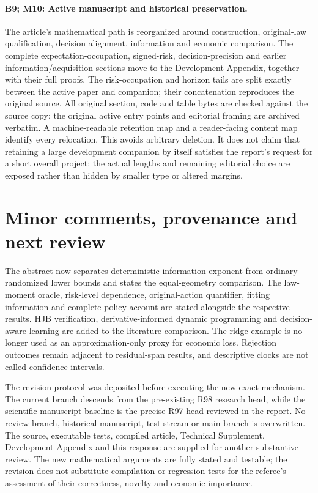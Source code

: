 \documentclass[ecta,nameyear,draft]{econsocart}
\begin{document}
\paragraph{B9; M10: Active manuscript and historical preservation.}
The article's mathematical path is reorganized around construction, original-law qualification, decision alignment, information and economic comparison. The complete expectation-occupation, signed-risk, decision-precision and earlier information/acquisition sections move to the Development Appendix, together with their full proofs. The risk-occupation and horizon tails are split exactly between the active paper and companion; their concatenation reproduces the original source. All original section, code and table bytes are checked against the source copy; the original active entry points and editorial framing are archived verbatim. A machine-readable retention map and a reader-facing content map identify every relocation. This avoids arbitrary deletion. It does not claim that retaining a large development companion by itself satisfies the report's request for a short overall project; the actual lengths and remaining editorial choice are exposed rather than hidden by smaller type or altered margins.

\section{Minor comments, provenance and next review}
The abstract now separates deterministic information exponent from ordinary randomized lower bounds and states the equal-geometry comparison. The law-moment oracle, risk-level dependence, original-action quantifier, fitting information and complete-policy account are stated alongside the respective results. HJB verification, derivative-informed dynamic programming and decision-aware learning are added to the literature comparison. The ridge example is no longer used as an approximation-only proxy for economic loss. Rejection outcomes remain adjacent to residual-span results, and descriptive clocks are not called confidence intervals.

The revision protocol was deposited before executing the new exact mechanism. The current branch descends from the pre-existing R98 research head, while the scientific manuscript baseline is the precise R97 head reviewed in the report. No review branch, historical manuscript, test stream or main branch is overwritten. The source, executable tests, compiled article, Technical Supplement, Development Appendix and this response are supplied for another substantive review. The new mathematical arguments are fully stated and testable; the revision does not substitute compilation or regression tests for the referee's assessment of their correctness, novelty and economic importance.
\end{document}
